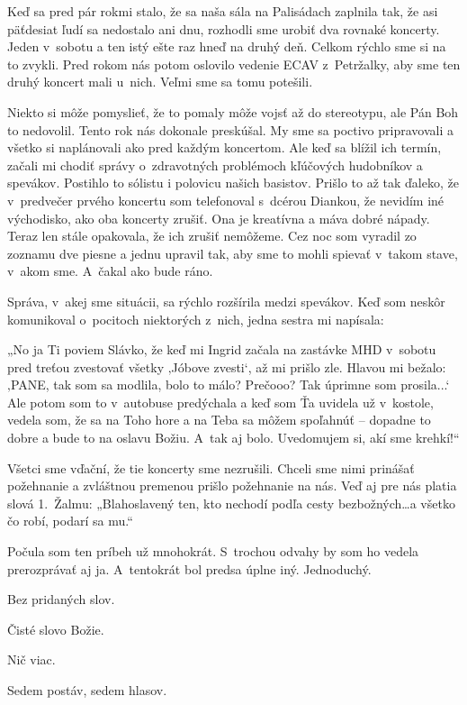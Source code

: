 Keď sa pred pár rokmi stalo, že sa naša sála na Palisádach zaplnila tak, že asi päťdesiat ľudí sa nedostalo ani dnu, rozhodli sme urobiť dva rovnaké koncerty. Jeden v~sobotu a ten istý ešte raz hneď na druhý deň. Celkom rýchlo sme si na to zvykli. Pred rokom nás potom oslovilo vedenie ECAV z~Petržalky, aby sme ten druhý koncert mali u~nich. Veľmi sme sa tomu potešili.

Niekto si môže pomyslieť, že to pomaly môže vojsť až do stereotypu, ale Pán Boh to nedovolil. Tento rok nás dokonale preskúšal. My sme sa poctivo pripravovali a všetko si naplánovali ako pred každým koncertom. Ale keď sa blížil ich termín, začali mi chodiť správy o~zdravotných problémoch kľúčových hudobníkov a spevákov. Postihlo to sólistu i polovicu našich basistov. Prišlo to až tak ďaleko, že v~predvečer prvého koncertu som telefonoval s~dcérou Diankou, že nevidím iné východisko, ako oba koncerty zrušiť. Ona je kreatívna a máva dobré nápady. Teraz len stále opakovala, že ich zrušiť nemôžeme. Cez noc som vyradil zo zoznamu dve piesne a jednu upravil tak, aby sme to mohli spievať v~takom stave, v~akom sme. A~čakal ako bude ráno.

Správa, v~akej sme situácii, sa rýchlo rozšírila medzi spevákov. Keď som neskôr komunikoval o~pocitoch niektorých z~nich, jedna sestra mi napísala:

„No ja Ti poviem Slávko, že keď mi Ingrid začala na zastávke MHD v~sobotu pred treťou zvestovať všetky ‚Jóbove zvesti‘, až mi prišlo zle. Hlavou mi bežalo: ‚PANE, tak som sa modlila, bolo to málo? Prečooo? Tak úprimne som prosila...‘ Ale potom som to v~autobuse predýchala a keď som Ťa uvidela už v~kostole, vedela som, že sa na Toho hore a na Teba sa môžem spoľahnúť -- dopadne to dobre a bude to na oslavu Božiu. A~tak aj bolo. Uvedomujem si, akí sme krehkí!“

Všetci sme vďační, že tie koncerty sme nezrušili. Chceli sme nimi prinášať požehnanie a zvláštnou premenou prišlo požehnanie na nás. Veď aj pre nás platia slová 1.~Žalmu: „Blahoslavený ten, kto nechodí podľa cesty bezbožných…a všetko čo robí, podarí sa mu.“


Počula som ten príbeh už mnohokrát. S~trochou odvahy by som ho vedela prerozprávať aj ja. A~tentokrát bol predsa úplne iný.
Jednoduchý.

Bez pridaných slov.

Čisté slovo Božie.

Nič viac.

Sedem postáv, sedem hlasov.

